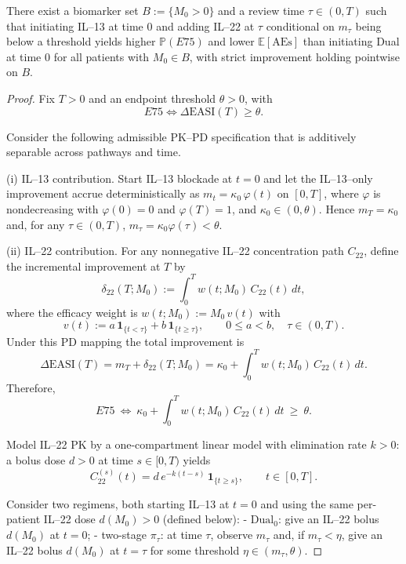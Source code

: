 ﻿\begin{theorem}\label{thm:biomarker-adaptive-superior}
There exist a biomarker set $B:=\{M_0>0\}$ and a review time $\tau\in(0,T)$ such that initiating IL--13 at time $0$ and adding IL--22 at $\tau$ conditional on $m_{\tau}$ being below a threshold yields higher $\mathbb{P}(E75)$ and lower $\mathbb{E}[\mathrm{AEs}]$ than initiating Dual at time $0$ for all patients with $M_0\in B$, with strict improvement holding pointwise on $B$.
\end{theorem}

\begin{proof}
Fix $T>0$ and an endpoint threshold $\theta>0$, with
\[
E75 \iff \Delta\mathrm{EASI}(T)\ge \theta.
\]

Consider the following admissible PK--PD specification that is additively separable across pathways and time.

(i) IL--13 contribution. Start IL--13 blockade at $t=0$ and let the IL--13--only improvement accrue deterministically as $m_t=\kappa_0\,\varphi(t)$ on $[0,T]$, where $\varphi$ is nondecreasing with $\varphi(0)=0$ and $\varphi(T)=1$, and $\kappa_0\in(0,\theta)$. Hence $m_T=\kappa_0$ and, for any $\tau\in(0,T)$, $m_{\tau}=\kappa_0\varphi(\tau)<\theta$.

(ii) IL--22 contribution. For any nonnegative IL--22 concentration path $C_{22}$, define the incremental improvement at $T$ by
\[
\delta_{22}(T;M_0):=\int_0^T w(t;M_0)\,C_{22}(t)\,dt,
\]
where the efficacy weight is $w(t;M_0):=M_0\,v(t)$ with
\[
 v(t):=a\,\mathbf{1}_{\{t<\tau\}}+b\,\mathbf{1}_{\{t\ge \tau\}},\qquad 0\le a<b,\quad \tau\in(0,T).
\]
Under this PD mapping the total improvement is
\[
\Delta\mathrm{EASI}(T)=m_T+\delta_{22}(T;M_0)=\kappa_0+\int_0^T w(t;M_0)\,C_{22}(t)\,dt.
\]
Therefore,
\[
E75\ \Longleftrightarrow\ \kappa_0+\int_0^T w(t;M_0)\,C_{22}(t)\,dt\ \ge\ \theta.
\]

Model IL--22 PK by a one-compartment linear model with elimination rate $k>0$: a bolus dose $d>0$ at time $s\in[0,T)$ yields
\[
C_{22}^{(s)}(t)=d\,e^{-k(t-s)}\,\mathbf{1}_{\{t\ge s\}},\qquad t\in[0,T].
\]

Consider two regimens, both starting IL--13 at $t=0$ and using the same per-patient IL--22 dose $d(M_0)>0$ (defined below):
- $\mathrm{Dual}_0$: give an IL--22 bolus $d(M_0)$ at $t=0$;
- two-stage $\pi_{\tau}$: at time $\tau$, observe $m_{\tau}$ and, if $m_{\tau}<\eta$, give an IL--22 bolus $d(M_0)$ at $t=\tau$ for some threshold $\eta\in(m_{\tau},\theta)$.


\end{proof}
